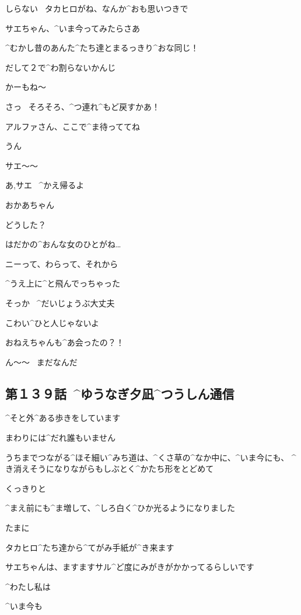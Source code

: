 \M しらない
\ タカヒロがね、なんか^{おも}{思}いつきで

\page
\A サエちゃん、^{いま}{今}ってみたらさあ

\A ^{むかし}{昔}のあんた^{たち}{達}とまるっきり^{おな}{同}じ！

\A だして２で^{わ}{割}らないかんじ

\M かーもね〜

\page
\M さっ
\ そろそろ、^{つ}{連}れ^{もど}{戻}すかあ！

\M アルファさん、ここで^{ま}{待}っててね

\A うん

\page[117]
\M サエ〜〜

\page
\M あ,サエ
\ ^{かえ}{帰}るよ

\SA おかあちゃん

\M どうした？

\SA はだかの^{おんな}{女}のひとがね…

\SA ニーって、わらって、それから

\SA ^{うえ}{上}に^{と}{飛}んでっちゃった

\page
\M そっか
\ ^{だいじょうぶ}{大丈夫}

\M こわい^{ひと}{人}じゃないよ

\page
\SA おねえちゃんも^{あ}{会}ったの？！

\A ん〜〜
\ まだなんだ


\subsection{第１３９話\ ^{ゆうなぎ}{夕凪}^{つうしん}{通信}}

\page[123]
\A ^{そと}{外}^{ある}{歩}きをしています

\A まわりには^{だれ}{誰}もいません

\page
\A うちまでつながる^{ほそ}{細}い^{みち}{道}は、^{くさ}{草}の^{なか}{中}に、^{いま}{今}にも、
^{き}{消}えそうになりながらもしぶとく^{かたち}{形}をとどめて

\A くっきりと

\A ^{まえ}{前}にも^{ま}{増}して、^{しろ}{白}く^{ひか}{光}るようになりました

\page
\A たまに

\A タカヒロ^{たち}{達}から^{てがみ}{手紙}が^{き}{来}ます

\A サエちゃんは、ますますサル^{ど}{度}にみがきがかかってるらしいです

\page[135]
\A ^{わたし}{私}は

\A ^{いま}{今}も

